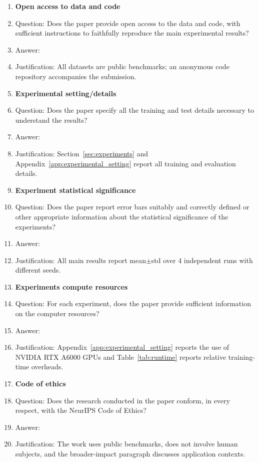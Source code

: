 \begin{enumerate}
\item {\bf Open access to data and code}
    \item[] Question: Does the paper provide open access to the data and code, with sufficient instructions to faithfully reproduce the main experimental results?
    \item[] Answer: \answerYes{}
    \item[] Justification: All datasets are public benchmarks; an anonymous code repository accompanies the submission.

\item {\bf Experimental setting/details}
    \item[] Question: Does the paper specify all the training and test details necessary to understand the results?
    \item[] Answer: \answerYes{}
    \item[] Justification: Section~\ref{sec:experiments} and Appendix~\ref{app:experimental_setting} report all training and evaluation details.

\item {\bf Experiment statistical significance}
    \item[] Question: Does the paper report error bars suitably and correctly defined or other appropriate information about the statistical significance of the experiments?
    \item[] Answer: \answerYes{}
    \item[] Justification: All main results report mean$\pm$std over 4 independent runs with different seeds.

\item {\bf Experiments compute resources}
    \item[] Question: For each experiment, does the paper provide sufficient information on the computer resources?
    \item[] Answer: \answerYes{}
    \item[] Justification: Appendix~\ref{app:experimental_setting} reports the use of NVIDIA RTX A6000 GPUs and Table~\ref{tab:runtime} reports relative training-time overheads.

\item {\bf Code of ethics}
    \item[] Question: Does the research conducted in the paper conform, in every respect, with the NeurIPS Code of Ethics?
    \item[] Answer: \answerYes{}
    \item[] Justification: The work uses public benchmarks, does not involve human subjects, and the broader-impact paragraph discusses application contexts.


\end{enumerate}
